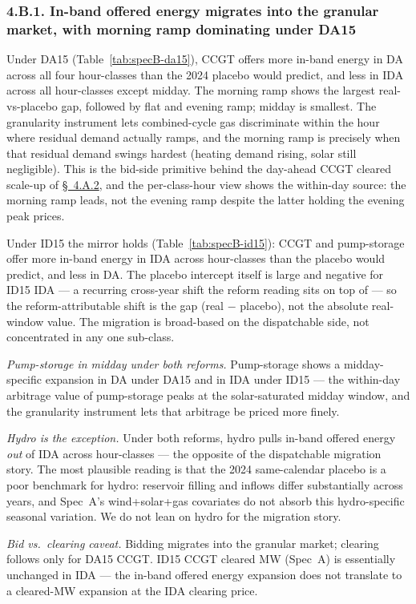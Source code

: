 \documentclass[11pt]{article}
\begin{document}
\subsubsection*{4.B.1. In-band offered energy migrates into the granular market, with morning ramp dominating under DA15}\label{sec:4v}
Under DA15 (Table~\ref{tab:specB-da15}), CCGT offers more in-band energy in DA across all four hour-classes than the 2024 placebo would predict, and less in IDA across all hour-classes except midday. The morning ramp shows the largest real-vs-placebo gap, followed by flat and evening ramp; midday is smallest. The granularity instrument lets combined-cycle gas discriminate within the hour where residual demand actually ramps, and the morning ramp is precisely when that residual demand swings hardest (heating demand rising, solar still negligible). This is the bid-side primitive behind the day-ahead CCGT cleared scale-up of \hyperref[sec:4iii]{\S~4.A.2}, and the per-class-hour view shows the within-day source: the morning ramp leads, not the evening ramp despite the latter holding the evening peak prices.

Under ID15 the mirror holds (Table~\ref{tab:specB-id15}): CCGT and pump-storage offer more in-band energy in IDA across hour-classes than the placebo would predict, and less in DA. The placebo intercept itself is large and negative for ID15 IDA --- a recurring cross-year shift the reform reading sits on top of --- so the reform-attributable shift is the gap (real $-$ placebo), not the absolute real-window value. The migration is broad-based on the dispatchable side, not concentrated in any one sub-class.

\emph{Pump-storage in midday under both reforms.} Pump-storage shows a midday-specific expansion in DA under DA15 and in IDA under ID15 --- the within-day arbitrage value of pump-storage peaks at the solar-saturated midday window, and the granularity instrument lets that arbitrage be priced more finely.

\emph{Hydro is the exception.} Under both reforms, hydro pulls in-band offered energy \emph{out} of IDA across hour-classes --- the opposite of the dispatchable migration story. The most plausible reading is that the 2024 same-calendar placebo is a poor benchmark for hydro: reservoir filling and inflows differ substantially across years, and Spec~A's wind+solar+gas covariates do not absorb this hydro-specific seasonal variation. We do not lean on hydro for the migration story.

\emph{Bid vs.\ clearing caveat.} Bidding migrates into the granular market; clearing follows only for DA15 CCGT. ID15 CCGT cleared MW (Spec~A) is essentially unchanged in IDA --- the in-band offered energy expansion does not translate to a cleared-MW expansion at the IDA clearing price.
\end{document}

